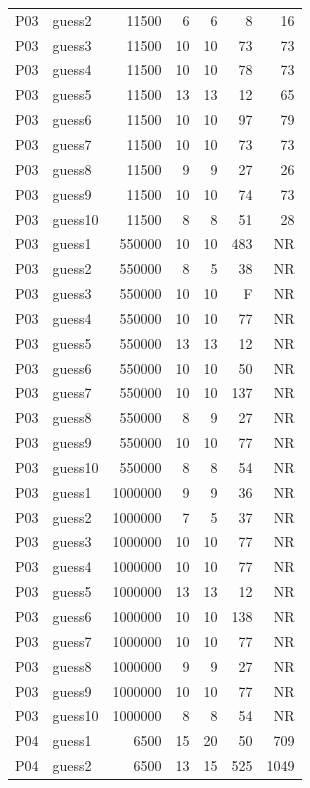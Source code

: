 {\begin{longtable}{llrrrrr}
P03 & guess2 & 11500 & 6 & 6 & 8 & 16 \\
P03 & guess3 & 11500 & 10 & 10 & 73 & 73 \\
P03 & guess4 & 11500 & 10 & 10 & 78 & 73 \\
P03 & guess5 & 11500 & 13 & 13 & 12 & 65 \\
P03 & guess6 & 11500 & 10 & 10 & 97 & 79 \\
P03 & guess7 & 11500 & 10 & 10 & 73 & 73 \\
P03 & guess8 & 11500 & 9 & 9 & 27 & 26 \\
P03 & guess9 & 11500 & 10 & 10 & 74 & 73 \\
P03 & guess10 & 11500 & 8 & 8 & 51 & 28 \\
P03 & guess1 & 550000 & 10 & 10 & 483 & NR \\
P03 & guess2 & 550000 & 8 & 5 & 38 & NR \\
P03 & guess3 & 550000 & 10 & 10 & F & NR \\
P03 & guess4 & 550000 & 10 & 10 & 77 & NR \\
P03 & guess5 & 550000 & 13 & 13 & 12 & NR \\
P03 & guess6 & 550000 & 10 & 10 & 50 & NR \\
P03 & guess7 & 550000 & 10 & 10 & 137 & NR \\
P03 & guess8 & 550000 & 8 & 9 & 27 & NR \\
P03 & guess9 & 550000 & 10 & 10 & 77 & NR \\
P03 & guess10 & 550000 & 8 & 8 & 54 & NR \\
P03 & guess1 & 1000000 & 9 & 9 & 36 & NR \\
P03 & guess2 & 1000000 & 7 & 5 & 37 & NR \\
P03 & guess3 & 1000000 & 10 & 10 & 77 & NR \\
P03 & guess4 & 1000000 & 10 & 10 & 77 & NR \\
P03 & guess5 & 1000000 & 13 & 13 & 12 & NR \\
P03 & guess6 & 1000000 & 10 & 10 & 138 & NR \\
P03 & guess7 & 1000000 & 10 & 10 & 77 & NR \\
P03 & guess8 & 1000000 & 9 & 9 & 27 & NR \\
P03 & guess9 & 1000000 & 10 & 10 & 77 & NR \\
P03 & guess10 & 1000000 & 8 & 8 & 54 & NR \\
P04 & guess1 & 6500 & 15 & 20 & 50 & 709 \\
P04 & guess2 & 6500 & 13 & 15 & 525 & 1049 \\

\end{longtable}}
